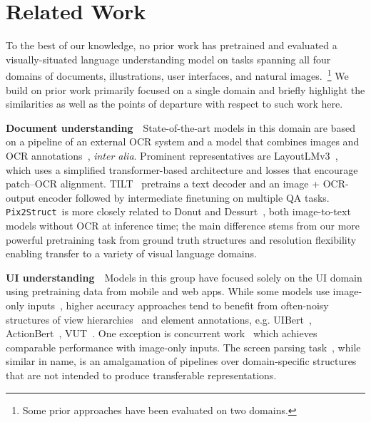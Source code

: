 \documentclass{article} %
\newcommand\ourmodel{{\texttt{Pix2Struct}}}
\begin{document}
\section{Related Work}
To the best of our knowledge, no prior work has pretrained and evaluated a visually-situated language understanding model on tasks spanning all four domains of documents, illustrations, user interfaces, and natural images.~\footnote{Some prior approaches have been evaluated on two domains.} We build on prior work primarily focused on a single domain and briefly highlight the similarities as well as the points of departure with respect to such work here.

\textbf{Document understanding}~~State-of-the-art models in this domain are based on a pipeline of an external OCR system and a model that combines images and OCR annotations~\citep{docformer,powalski2021going,layoutlmv2}, \textit{inter alia}. Prominent representatives are LayoutLMv3~\citep{layoutlmv3}, which uses a simplified transformer-based architecture and losses that encourage patch--OCR alignment. TILT~\citep{powalski2021going} pretrains a text decoder and an image + OCR-output encoder followed by intermediate finetuning on multiple QA tasks. \ourmodel~is more closely related to Donut and Dessurt~\citep{dessurt}, both image-to-text models without OCR at inference time; the main difference stems from our more powerful pretraining task from ground truth structures and resolution flexibility enabling transfer to a variety of visual language domains.

\textbf{UI understanding}~~Models in this group have focused solely on the UI domain using pretraining data from mobile and web apps. While some models use image-only inputs~\citep{Liu2018LearningDS, Chen2020UnblindYA}, higher accuracy approaches tend to benefit from often-noisy structures of view hierarchies~\citep{li-etal-2020-mapping} and element annotations, e.g. UIBert~\citep{uibert}, ActionBert~\citep{actionbert}, VUT~\citep{li2021vut}. One exception is concurrent work~\citep{li2023spotlight} which achieves comparable performance with image-only inputs. The screen parsing task~\citep{wu2021screen}, while similar in name, is an amalgamation of pipelines over domain-specific structures that are not intended to produce transferable representations.
\end{document}
